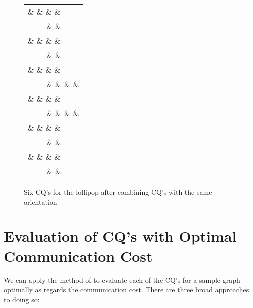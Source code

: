 \begin{figure}[htfb]
{\begin{center}
\begin{tabular}{l}
 \&  \&  \&  \&\\
~~~~ \&  \& \\
 \&  \&  \&  \&\\
~~~~ \&  \& \\
 \&  \&  \&  \&\\
~~~~ \&  \&  \&  \& \\
 \&  \&  \&  \&\\
~~~~ \&  \&  \&  \& \\
 \&  \&  \&  \&\\
~~~~ \&  \& \\
 \&  \&  \&  \&\\
~~~~ \&  \& \\
\end{tabular}
\end{center}
}
\caption{Six CQ's for the lollipop after combining CQ's with the same orientation}
\label{lol-oriented-fig}
\end{figure}


\section{Evaluation of CQ's with Optimal Communication Cost}
\label{opt-eval-sect}

We can apply the method of \cite{AU10} to evaluate each of the CQ's for a sample graph  optimally as regards the communication cost.  There are three broad approaches to doing so:

